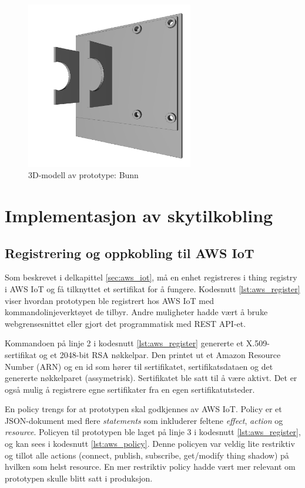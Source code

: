 \begin{figure}
\includegraphics[width=0.65\textwidth, center]{fig/prototype/bunn_fratopp}
\caption{3D-modell av prototype: Bunn}
\label{fig:3dmodell_bunn}
\end{figure}

\section{Implementasjon av skytilkobling}
\label{sec:implementasjon_skytilkobling}

\subsection{Registrering og oppkobling til AWS IoT}
Som beskrevet i delkapittel \ref{sec:aws_iot}, må en enhet registreres i thing registry i AWS IoT og
få tilknyttet et sertifikat for å fungere. Kodesnutt \ref{lst:aws_register} viser hvordan prototypen ble registrert
hos AWS IoT med kommandolinjeverktøyet de tilbyr. Andre muligheter hadde vært å bruke webgrensesnittet eller
gjort det programmatisk med REST API-et.

Kommandoen på linje 2 i kodesnutt \ref{lst:aws_register} genererte et X.509-sertifikat og et 2048-bit RSA nøkkelpar.
Den printet ut et Amazon Resource Number (ARN) og en id som hører til sertifikatet,
sertifikatsdataen og det genererte nøkkelparet (assymetrisk). Sertifikatet ble satt til å være aktivt.
Det er også mulig å registrere egne sertifikater fra en egen sertifikatutsteder.

En policy trengs for at prototypen skal godkjennes av AWS IoT. Policy er et JSON-dokument med flere
\textit{statements} som inkluderer feltene \textit{effect}, \textit{action} og \textit{resource}.
Policyen til prototypen ble laget på linje 3 i kodesnutt \ref{lst:aws_register}, og kan sees i kodesnutt \ref{lst:aws_policy}.
Denne policyen var veldig lite restriktiv og tillot alle actions (connect, publish, subscribe, get/modify thing shadow) på hvilken
som helst resource. En mer restriktiv policy hadde vært mer relevant om prototypen skulle blitt satt i produksjon.

